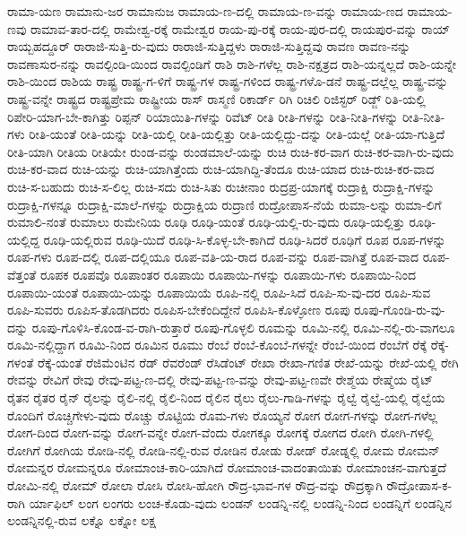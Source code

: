 {ರಾಮಾ-ಯಣ
ರಾಮಾನು-ಜರ
ರಾಮಾನುಜ
ರಾಮಾಯ-ಣ-ದಲ್ಲಿ
ರಾಮಾಯ-ಣ-ವನ್ನು
ರಾಮಾಯ-ಣದ
ರಾಮಾಯ-ಣವು
ರಾಮಾವ-ತಾರ-ದಲ್ಲಿ
ರಾಮೇಶ್ವ-ರಕ್ಕೆ
ರಾಮೇಶ್ವರ
ರಾಯ-ಪು-ರಕ್ಕೆ
ರಾಯ-ಪುರ-ದಲ್ಲಿ
ರಾಯಪುರ-ವನ್ನು
ರಾಯ್
ರಾಯ್ಬಹದ್ದೂರ್
ರಾರಾಜಿ-ಸುತ್ತಿ-ರು-ವುದು
ರಾರಾಜಿ-ಸುತ್ತಿದ್ದಳು
ರಾರಾಜಿ-ಸುತ್ತಿದ್ದವು
ರಾವಣ
ರಾವಣ-ನನ್ನು
ರಾವಣಾಸುರ-ನನ್ನು
ರಾವಲ್ಪಿಂಡಿ-ಯಿಂದ
ರಾವಲ್ಪಿಂಡಿಗೆ
ರಾಶಿ
ರಾಶಿ-ಗಳೆಲ್ಲ
ರಾಶಿ-ನಕ್ಷತ್ರದ
ರಾಶಿ-ಯನ್ನಲ್ಲದೆ
ರಾಶಿ-ಯನ್ನೇ
ರಾಶಿ-ಯಿಂದ
ರಾಶಿಯ
ರಾಷ್ಟ್ರ
ರಾಷ್ಟ್ರ-ಗ-ಳಿಗೆ
ರಾಷ್ಟ್ರ-ಗಳ
ರಾಷ್ಟ್ರ-ಗಳಿಂದ
ರಾಷ್ಟ್ರ-ಗಳೊ-ಡನೆ
ರಾಷ್ಟ್ರ-ದಲ್ಲೆಲ್ಲ
ರಾಷ್ಟ್ರ-ವನ್ನು
ರಾಷ್ಟ್ರ-ವನ್ನೇ
ರಾಷ್ಟ್ರದ
ರಾಷ್ಟ್ರಪ್ರೇಮ
ರಾಷ್ಟ್ರೀಯ
ರಾಸ್
ರಾಸ್ಮಣಿ
ರಿಕಾರ್ಡ್
ರಿಗಿ
ರಿಚಿಲಿ
ರಿಜಿಸ್ಟರ್
ರಿಡ್ಜ್
ರಿತಿ-ಯಲ್ಲಿ
ರಿಪೇರಿ-ಯಾಗ-ಬೇ-ಕಾಗಿತ್ತು
ರಿಪ್ಪನ್
ರಿಯಾಯಿತಿ-ಗಳನ್ನು
ರಿವೆಟ್
ರೀತಿ
ರೀತಿ-ಗಳನ್ನು
ರೀತಿ-ನೀತಿ-ಗಳನ್ನು
ರೀತಿ-ನೀತಿ-ಗಳು
ರೀತಿ-ಯಂತೆ
ರೀತಿ-ಯನ್ನು
ರೀತಿ-ಯಲ್ಲಿ
ರೀತಿ-ಯಲ್ಲಿತ್ತು
ರೀತಿ-ಯಲ್ಲಿದ್ದು-ದನ್ನು
ರೀತಿ-ಯಲ್ಲೆ
ರೀತಿ-ಯಾ-ಗುತ್ತಿದೆ
ರೀತಿ-ಯಾಗಿ
ರೀತಿಯ
ರೀತಿಯೇ
ರುಂಡ-ವನ್ನು
ರುಂಡಮಾಲೆ-ಯನ್ನು
ರುಚಿ
ರುಚಿ-ಕರ-ವಾಗ
ರುಚಿ-ಕರ-ವಾಗಿ-ರು-ವುದು
ರುಚಿ-ಕರ-ವಾದ
ರುಚಿ-ಯನ್ನು
ರುಚಿ-ಯಾಗಿತ್ತೆಂದು
ರುಚಿ-ಯಾಗಿದ್ದಿ-ತೆಂದೂ
ರುಚಿ-ಯಾದ
ರುಚಿ-ರುಚಿ-ಕರ-ವಾದ
ರುಚಿ-ಸ-ಬಹುದು
ರುಚಿ-ಸ-ಲಿಲ್ಲ
ರುಚಿ-ಸದು
ರುಚಿ-ಸಿತು
ರುಚೀನಾಂ
ರುದ್ರಪ್ರ-ಯಾಗಕ್ಕೆ
ರುದ್ರಾಕ್ಷಿ
ರುದ್ರಾಕ್ಷಿ-ಗಳನ್ನು
ರುದ್ರಾಕ್ಷಿ-ಗಳನ್ನೂ
ರುದ್ರಾಕ್ಷಿ-ಮಾಲೆ-ಗಳನ್ನು
ರುದ್ರಾಕ್ಷಿಯ
ರುದ್ರಾಣಿ
ರುದ್ರೋಪಾಸ-ನೆಯೆ
ರುಮಾ-ಲನ್ನು
ರುಮಾ-ಲಿಗೆ
ರುಮಾಲಿ-ನಂತೆ
ರುಮಾಲು
ರುಮೇನಿಯ
ರೂಢಿ
ರೂಢಿ-ಯಂತೆ
ರೂಢಿ-ಯಲ್ಲಿ-ರು-ವುದು
ರೂಢಿ-ಯಲ್ಲಿತ್ತು
ರೂಢಿ-ಯಲ್ಲಿದ್ದ
ರೂಢಿ-ಯಲ್ಲಿರುವ
ರೂಢಿ-ಯಿದೆ
ರೂಢಿ-ಸಿ-ಕೊಳ್ಳ-ಬೇ-ಕಾಗಿದೆ
ರೂಢಿ-ಸಿದರೆ
ರೂಢಿಗೆ
ರೂಪ
ರೂಪ-ಗಳನ್ನು
ರೂಪ-ಗಳು
ರೂಪ-ದಲ್ಲಿ
ರೂಪ-ದಲ್ಲಿಯೂ
ರೂಪ-ವತಿ-ಯ-ರಾದ
ರೂಪ-ವನ್ನು
ರೂಪ-ವಾಗಿತ್ತೆ
ರೂಪ-ವಾದ
ರೂಪ-ವೆತ್ತಂತೆ
ರೂಪಕ
ರೂಪವೊ
ರೂಪಾಂತರ
ರೂಪಾಯಿ
ರೂಪಾಯಿ-ಗಳನ್ನು
ರೂಪಾಯಿ-ಗಳು
ರೂಪಾಯಿ-ನಿಂದ
ರೂಪಾಯಿ-ಯಂತೆ
ರೂಪಾಯಿ-ಯನ್ನು
ರೂಪಾಯಿಯೆ
ರೂಪಿ-ನಲ್ಲಿ
ರೂಪಿ-ಸಿದೆ
ರೂಪಿ-ಸು-ವು-ದರ
ರೂಪಿ-ಸುವ
ರೂಪಿ-ಸುವರು
ರೂಪಿಸ-ತೊಡಗಿದರು
ರೂಪಿಸ-ಬೇಕೆಂದಿದ್ದೇನೆ
ರೂಪಿಸಿ-ಕೊಳ್ಳೋಣ
ರೂಪು
ರೂಪು-ಗೊಂಡಿ-ರು-ವು-ದನ್ನು
ರೂಪು-ಗೊಳಿಸಿ-ಕೊಂಡ-ವ-ರಾಗಿ-ರುತ್ತಾರೆ
ರೂಪು-ಗೊಳ್ಳಲಿ
ರೂಮನ್ನು
ರೂಮಿ-ನಲ್ಲಿ
ರೂಮಿ-ನಲ್ಲಿ-ರು-ವಾಗಲೂ
ರೂಮಿ-ನಲ್ಲಿದ್ದಾಗ
ರೂಮಿ-ನಿಂದ
ರೂಮಿನ
ರೂಮು
ರೆಂಬೆ
ರೆಂಬೆ-ಕೊಂಬೆ-ಗಳನ್ನೇ
ರೆಂಬೆ-ಯಿಂದ
ರೆಂಬೆಗೆ
ರೆಕ್ಕೆ
ರೆಕ್ಕೆ-ಗಳಂತೆ
ರೆಕ್ಕೆ-ಯಂತೆ
ರೆಜಿಮೆಂಟಿನ
ರೆಡ್
ರೆವರೆಂಡ್
ರೆಸಿಡೆಂಟ್
ರೇಖಾ
ರೇಖಾ-ಗಣಿತ
ರೇಖೆ-ಯನ್ನು
ರೇಖೆ-ಯಲ್ಲಿ
ರೇಗಿ
ರೇವನ್ನು
ರೇವಿಗೆ
ರೇವು
ರೇವು-ಪಟ್ಟ-ಣ-ದಲ್ಲಿ
ರೇವು-ಪಟ್ಟ-ಣ-ವನ್ನು
ರೇವು-ಪಟ್ಟ-ಣವೇ
ರೇಶ್ಮೆಯ
ರೇಷ್ಮೆಯ
ರೈಟ್
ರೈತನ
ರೈತರ
ರೈನ್
ರೈಲನ್ನು
ರೈಲಿ-ನಲ್ಲಿ
ರೈಲಿ-ನಿಂದ
ರೈಲಿನ
ರೈಲು
ರೈಲು-ಗಾಡಿ-ಗಳನ್ನು
ರೈಲ್ವೆ
ರೈಲ್ವೆ-ಯಲ್ಲಿ
ರೈಲ್ವೆಯ
ರೊಂದಿಗೆ
ರೊಚ್ಚಿಗೇಳು-ವುದು
ರೊಚ್ಚು
ರೊಟ್ಟಿಯ
ರೊಮ-ಗಳು
ರೊಯ್ಯನೆ
ರೋಗ
ರೋಗ-ಗಳನ್ನು
ರೋಗ-ಗಳೆಲ್ಲ
ರೋಗ-ದಿಂದ
ರೋಗ-ವನ್ನು
ರೋಗ-ವನ್ನೇ
ರೋಗ-ವೆಂದು
ರೋಗಕ್ಕೂ
ರೋಗಕ್ಕೆ
ರೋಗದ
ರೋಗಿ
ರೋಗಿ-ಗಳಲ್ಲಿ
ರೋಗಿಗೆ
ರೋಗಿಯ
ರೋಡಿ-ನಲ್ಲಿ
ರೋಡಿ-ನಲ್ಲಿ-ರುವ
ರೋಡಿನ
ರೋಡು
ರೋಡ್
ರೋಡ್ನಲ್ಲಿ
ರೋಮ
ರೋಮನ್
ರೋಮನ್ನರ
ರೋಮನ್ನರೂ
ರೋಮಾಂಚ-ಕಾರಿ-ಯಾಗಿದೆ
ರೋಮಾಂಚ-ವಾದಂತಾಯಿತು
ರೋಮಾಂಚನ-ವಾಗುತ್ತದೆ
ರೋಮಿ-ನಲ್ಲಿ
ರೋಮ್
ರೋಲಾ
ರೋಸಿ
ರೋಸಿ-ಹೋಗಿ
ರೌದ್ರ-ಭಾವ-ಗಳ
ರೌದ್ರ-ವನ್ನು
ರೌದ್ರಕ್ಕಾಗಿ
ರೌದ್ರೋಪಾಸ-ಕ-ರಾಗಿ
ರ್ಯಾಫಿಲ್
ಲಂಗ
ಲಂಗರು
ಲಂಚ-ಕೊಡು-ವುದು
ಲಂಡನ್
ಲಂಡನ್ನಿ-ನಲ್ಲಿ
ಲಂಡನ್ನಿ-ನಿಂದ
ಲಂಡನ್ನಿಗೆ
ಲಂಡನ್ನಿನ
ಲಂಡನ್ನಿನಲ್ಲಿ-ರುವ
ಲಕ್ನೊ
ಲಕ್ನೋ
ಲಕ್ಷ
}
